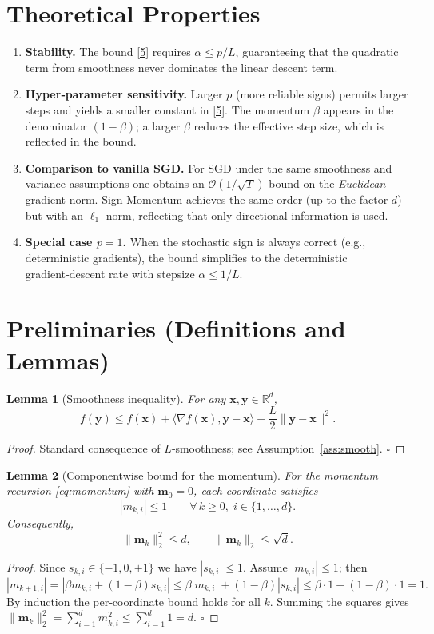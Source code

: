 \documentclass{article}
\newtheorem{lemma}{Lemma}
\begin{document}
\section*{Theoretical Properties}
\begin{enumerate}[label=\arabic*.]
\item \textbf{Stability.} The bound \eqref{5} requires $\alpha\le p/L$, guaranteeing that the quadratic term from smoothness never dominates the linear descent term.
\item \textbf{Hyper‑parameter sensitivity.} Larger $p$ (more reliable signs) permits larger steps and yields a smaller constant in \eqref{5}. The momentum $\beta$ appears in the denominator $(1-\beta)$; a larger $\beta$ reduces the effective step size, which is reflected in the bound.
\item \textbf{Comparison to vanilla SGD.} For SGD under the same smoothness and variance assumptions one obtains an $\mathcal{O}(1/\sqrt{T})$ bound on the \emph{Euclidean} gradient norm. Sign‑Momentum achieves the same order (up to the factor $d$) but with an $\ell_{1}$ norm, reflecting that only directional information is used.
\item \textbf{Special case $p=1$.} When the stochastic sign is always correct (e.g., deterministic gradients), the bound simplifies to the deterministic gradient‑descent rate with stepsize $\alpha\le 1/L$.
\end{enumerate}

\section*{Preliminaries (Definitions and Lemmas)}
\begin{lemma}[Smoothness inequality]\label{lem:smooth}
For any $\mathbf{x},\mathbf{y}\in\mathbb{R}^{d}$,
\[
f(\mathbf{y})\le f(\mathbf{x})+\langle\nabla f(\mathbf{x}),\mathbf{y}-\mathbf{x}\rangle
+\frac{L}{2}\|\mathbf{y}-\mathbf{x}\|^{2}.
\]
\end{lemma}
\begin{proof}
Standard consequence of $L$‑smoothness; see Assumption~\ref{ass:smooth}. \hfill $\square$
\end{proof}

\begin{lemma}[Componentwise bound for the momentum]\label{lem:mombound}
For the momentum recursion \eqref{eq:momentum} with $\mathbf{m}_{0}=0$, each coordinate satisfies
\[
|m_{k,i}|\le 1\qquad\forall\,k\ge0,\; i\in\{1,\dots,d\}.
\]
Consequently,
\[
\|\mathbf{m}_{k}\|_{2}^{2}\le d,\qquad
\|\mathbf{m}_{k}\|_{2}\le\sqrt{d}.
\]
\end{lemma}
\begin{proof}
Since $s_{k,i}\in\{-1,0,+1\}$ we have $|s_{k,i}|\le1$.  
Assume $|m_{k,i}|\le1$; then
\[
|m_{k+1,i}|=|\beta m_{k,i}+(1-\beta)s_{k,i}|
\le\beta|m_{k,i}|+(1-\beta)|s_{k,i}|
\le\beta\cdot1+(1-\beta)\cdot1=1.
\]
By induction the per‑coordinate bound holds for all $k$.  
Summing the squares gives $\|\mathbf{m}_{k}\|_{2}^{2}=\sum_{i=1}^{d}m_{k,i}^{2}\le\sum_{i=1}^{d}1=d$. \hfill $\square$
\end{proof}
\end{document}
